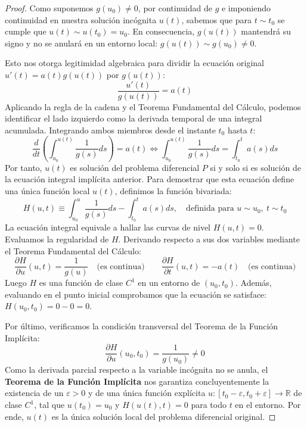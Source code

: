\begin{proof}
    Como suponemos $g(u_0) \neq 0$, por continuidad de $g$ e imponiendo continuidad en nuestra solución incógnita $u(t)$, sabemos que para $t \sim t_0$ se cumple que $u(t) \sim u(t_0) = u_0$. En consecuencia, $g(u(t))$ mantendrá su signo y no se anulará en un entorno local: $g(u(t)) \sim g(u_0) \neq 0$. 
    
    Esto nos otorga legitimidad algebraica para dividir la ecuación original $u'(t) = a(t) g(u(t))$ por $g(u(t))$:
    \[
        \frac{u'(t)}{g(u(t))} = a(t)
    \]
    Aplicando la regla de la cadena y el Teorema Fundamental del Cálculo, podemos identificar el lado izquierdo como la derivada temporal de una integral acumulada. Integrando ambos miembros desde el instante $t_0$ hasta $t$:
    \[
        \frac{d}{dt} \left( \int_{u_0}^{u(t)} \frac{1}{g(s)} ds \right) = a(t)  \iff \int_{u_0}^{u(t)} \frac{1}{g(s)} ds = \int_{t_0}^t a(s) ds
    \]
    Por tanto, $u(t)$ es solución del problema diferencial $P$ si y solo si es solución de la ecuación integral implícita anterior. Para demostrar que esta ecuación define una única función local $u(t)$, definimos la función bivariada:
    \[
        H(u,t) \equiv \int_{u_0}^{u} \frac{1}{g(s)} ds - \int_{t_0}^t a(s) ds, \quad \text{definida para } u \sim u_0, \ t \sim t_0
    \]
    La ecuación integral equivale a hallar las curvas de nivel $H(u,t) = 0$. Evaluamos la regularidad de $H$. Derivando respecto a sus dos variables mediante el Teorema Fundamental del Cálculo:
    \[
        \frac{\partial H}{\partial u} (u,t) = \frac{1}{g(u)} \quad \text{(es continua)} \qquad \frac{\partial H}{\partial t} (u,t) = -a(t) \quad \text{(es continua)}
    \]
    Luego $H$ es una función de clase $C^1$ en un entorno de $(u_0, t_0)$. Además, evaluando en el punto inicial comprobamos que la ecuación se satisface: $H(u_0, t_0) = 0 - 0 = 0$. 
    
    Por último, verificamos la condición transversal del Teorema de la Función Implícita:
    \[
        \frac{\partial H}{\partial u} (u_0, t_0) = \frac{1}{g(u_0)} \neq 0
    \]
    Como la derivada parcial respecto a la variable incógnita no se anula, el \textbf{Teorema de la Función Implícita} nos garantiza concluyentemente la existencia de un $\varepsilon > 0$ y de una única función explícita $u : [t_0 - \varepsilon, t_0 + \varepsilon] \to \mathbb{R}$ de clase $C^1$, tal que $u(t_0) = u_0$ y $H(u(t), t) = 0$ para todo $t$ en el entorno. Por ende, $u(t)$ es la única solución local del problema diferencial original.
\end{proof}

